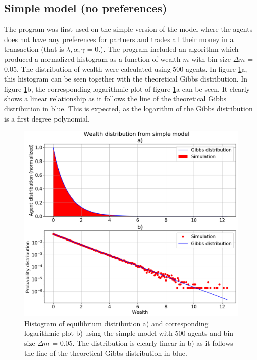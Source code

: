 \documentclass[11pt,a4paper,titlepage]{article}
\begin{document}
\subsection{Simple model (no preferences)}
The program was first used on the simple version of the model where the agents does not have any preferences for partners and trades all their money in a transaction (that is $\lambda, \alpha, \gamma$ = 0.). The program included an algorithm which produced a normalized histogram as a function of wealth $m$ with bin size $\Delta m$ = 0.05. The distribution of wealth were calculated using 500 agents. In figure \ref{fig:b_hist}a, this histogram can be seen together with the theoretical Gibbs distribution. In figure \ref{fig:b_hist}b, the corresponding logarithmic plot of figure \ref{fig:b_hist}a can be seen. It clearly shows a linear relationship as it follows the line of the theoretical Gibbs distribution in blue. This is expected, as the logarithm of the Gibbs distribution is a first degree polynomial. 

\begin{figure}[h!]
\centering
\includegraphics[scale=0.35]{task_b_histogram_agents_500_MCC_1000_N_trans_10000000.png}
\caption{Histogram of equilibrium distribution a) and corresponding logarithmic plot b) using the simple model with 500 agents and bin size $\Delta m$ = 0.05. The distribution is clearly linear in b) as it follows the line of the theoretical Gibbs distribution in blue.   \label{fig:b_hist}}
\end{figure}
\end{document}

